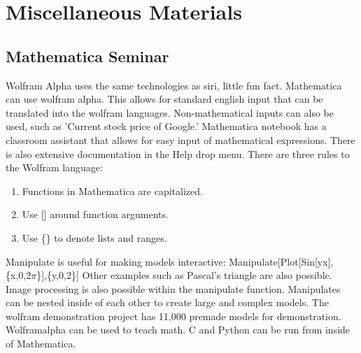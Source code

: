 \documentclass[crop=false,class=article,oneside]{standalone}
\begin{document}
    \ifx\ifphysicscourseselectromagnetismI\undefined
        \section*{Miscellaneous Materials}
        \setcounter{section}{1}
    \fi
    \subsection{Mathematica Seminar}
        Wolfram Alpha uses the same technologies as siri,
        little fun fact. Mathematica can use wolfram alpha.
        This allows for standard english input that can be
        translated into the wolfram languages.
        Non-mathematical inputs can also be used, such as
        'Current stock price of Google.'
        Mathematica notebook has a classroom assistant
        that allows for easy input of mathematical
        expressions. There is also extensive documentation
        in the Help drop menu. There are three rules to
        the Wolfram language:
        \begin{enumerate}
            \item Functions in Mathematica are capitalized.
            \item Use [] around function arguments.
            \item Use \{\} to denote lists and ranges.
        \end{enumerate}
        Manipulate is useful for making models interactive:
        Manipulate[Plot[Sin[yx],\{x,0,2$\pi$\}],\{y,0,2\}]
        Other examples such as Pascal's triangle are also
        possible. Image processing is also possible within
        the manipulate function. Manipulates can be nested
        inside of each other to create large and complex
        models. The wolfram demonstration project has 11,000
        premade models for demonstration. Wolframalpha can
        be used to teach math. C and Python can be run
        from inside of Mathematica.
\end{document}
